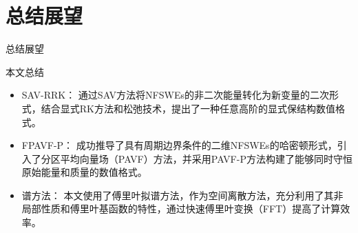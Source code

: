\documentclass[aspectratio=169]{beamer}
\begin{document}

\section{总结展望}
\begin{frame}{总结展望}
	\begin{block}{本文总结}
			\begin{itemize}
				\item \textcolor[rgb]{0.227,0.373,0.306}{SAV-RRK：} 通过SAV方法将NFSWEs的非二次能量转化为新变量的二次形式，结合显式RK方法和松弛技术，提出了一种任意高阶的显式保结构数值格式。
				\item \textcolor[rgb]{0.227,0.373,0.306}{FPAVF-P：} 成功推导了具有周期边界条件的二维NFSWEs的哈密顿形式，引入了分区平均向量场（PAVF）方法，并采用PAVF-P方法构建了能够同时守恒原始能量和质量的数值格式。
				\item \textcolor[rgb]{0.227,0.373,0.306}{谱方法：} 本文使用了傅里叶拟谱方法，作为空间离散方法，充分利用了其非局部性质和傅里叶基函数的特性，通过快速傅里叶变换（FFT）提高了计算效率。
			\end{itemize}
		\end{block}
		
\end{frame}
\end{document}
